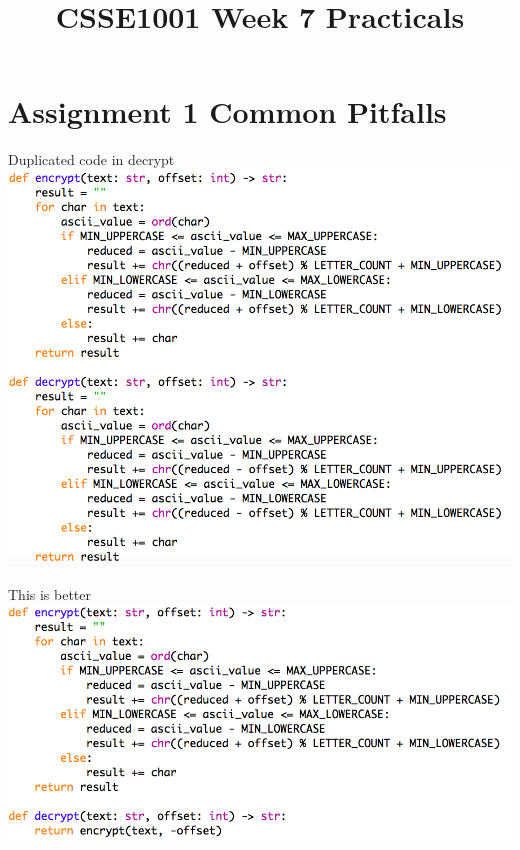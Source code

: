 \documentclass[week2]{csse1001}
\title{CSSE1001 Week 7 Practicals}
\begin{document}
\begin{frame} 
\maketitle
\end{frame}

\section{Assignment 1 Common Pitfalls}

\begin{topic}{Duplicated code in decrypt}
\includegraphics[width=\textwidth]{a1pitfalls/baddecrypt}
\end{topic}

\begin{topic}{This is better}
\includegraphics[height=\textheight]{a1pitfalls/gooddecrypt}
\end{topic}
\end{document}
